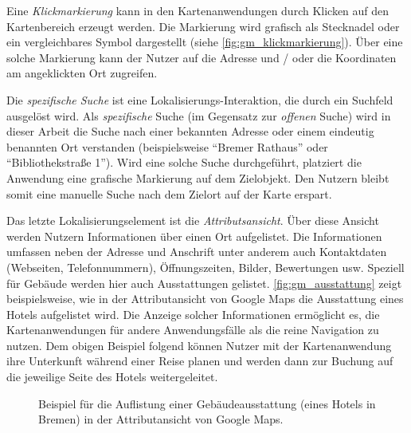 Eine \emph{Klickmarkierung} kann in den Kartenanwendungen durch Klicken auf den Kartenbereich erzeugt werden.
Die Markierung wird grafisch als Stecknadel oder ein vergleichbares Symbol dargestellt (siehe \autoref{fig:gm_klickmarkierung}).
Über eine solche Markierung kann der Nutzer auf die Adresse und / oder die Koordinaten am angeklickten Ort zugreifen.

Die \emph{spezifische Suche} ist eine Lokalisierungs-Interaktion, die durch ein Suchfeld ausgelöst wird.
Als \emph{spezifische} Suche (im Gegensatz zur \emph{offenen} Suche) wird in dieser Arbeit die Suche nach einer bekannten Adresse oder einem eindeutig benannten Ort verstanden (beispielsweise \enquote{Bremer Rathaus} oder \enquote{Bibliothekstraße 1}).
Wird eine solche Suche durchgeführt, platziert die Anwendung eine grafische Markierung auf dem Zielobjekt.
Den Nutzern bleibt somit eine manuelle Suche nach dem Zielort auf der Karte erspart.

Das letzte Lokalisierungselement ist die \emph{Attributsansicht}.
Über diese Ansicht werden Nutzern Informationen über einen Ort aufgelistet.
Die Informationen umfassen neben der Adresse und Anschrift unter anderem auch Kontaktdaten (Webseiten, Telefonnummern), Öffnungszeiten, Bilder, Bewertungen usw.
Speziell für Gebäude werden hier auch Ausstattungen gelistet.
\autoref{fig:gm_ausstattung} zeigt beispielsweise, wie in der Attributansicht von Google Maps die Ausstattung eines Hotels aufgelistet wird.
Die Anzeige solcher Informationen ermöglicht es, die Kartenanwendungen für andere Anwendungsfälle als die reine Navigation zu nutzen.
Dem obigen Beispiel folgend können Nutzer mit der Kartenanwendung ihre Unterkunft während einer Reise planen und werden dann zur Buchung auf die jeweilige Seite des Hotels weitergeleitet.

\begin{figure}
	\centering
	\caption{Beispiel für die Auflistung einer Gebäudeausstattung (eines Hotels in Bremen) in der Attributansicht von Google Maps.}
	\label{fig:gm_ausstattung}
\end{figure}

